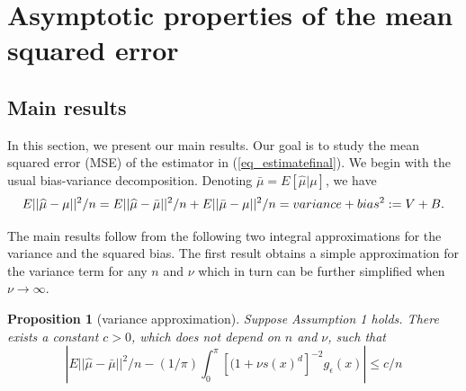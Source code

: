 \documentclass[11pt]{article}
\newtheorem{proposition}[theorem]{Proposition}
\numberwithin{equation}{section}
\numberwithin{figure}{section}
\begin{document}
%



\section{Asymptotic properties of the mean squared error}\label{sec_mainresultstechinical}

\subsection{Main results}
\iffalse
In this section, we present our main results. Our goal is to study the mean squared error (MSE) of the estimator in (\ref{eq_estimatefinal}). We begin with the usual bias-variance decomposition. Denoting $\bar{\mu}=E[\widehat{\mu}|{\mu}]$, we have
\begin{equation*}
    E||\widehat{\mu}-\mu||^2/n=E||\widehat{\mu}-\bar{\mu}||^2/n+E||\bar{\mu}-\mu||^2/n
    =variance+bias^2\\
    :=V+B.
\end{equation*}

The main results follow from the following two integral approximations for the variance and the squared bias. The first result obtains a simple approximation for the variance term for any $n$ and $\nu$ which in turn can be further simplified when $\nu\rightarrow {\infty}$.

\begin{proposition}[variance approximation]
Suppose Assumption 1 holds. There exists a constant $c>0$, which does not depend on $n$ and $\nu$, such that
\begin{equation*}
\left| E||\widehat{\mu}-\bar{\mu}||^2/n-(1/{\pi})\int_{0}^{\pi}[(1+\nu s(x)^d]^{-2}g_{\epsilon}(x) \right| \leq{c/n}
\end{equation*}
\end{proposition}
\end{document}
